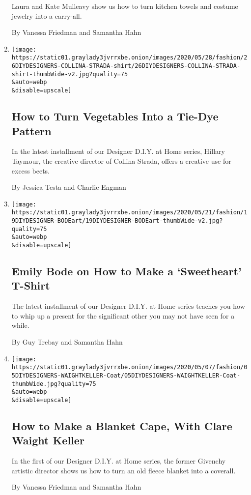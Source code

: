 \begin{enumerate}
  Laura and Kate Mulleavy show us how to turn kitchen towels and costume
  jewelry into a carry-all.

  By Vanessa Friedman and Samantha Hahn
\item
  \href{/2020/05/27/style/tie-dye-plaid-with-collina-strada.html}{}

  \texttt{[image: https://static01.graylady3jvrrxbe.onion/images/2020/05/28/fashion/26DIYDESIGNERS-COLLINA-STRADA-shirt/26DIYDESIGNERS-COLLINA-STRADA-shirt-thumbWide-v2.jpg?quality=75\\\&auto=webp\\\&disable=upscale]}

  \hypertarget{how-to-turn-vegetables-into-a-tie-dye-pattern}{%
  \subsection{How to Turn Vegetables Into a Tie-Dye
  Pattern}\label{how-to-turn-vegetables-into-a-tie-dye-pattern}}

  In the latest installment of our Designer D.I.Y. at Home series,
  Hillary Taymour, the creative director of Collina Strada, offers a
  creative use for excess beets.

  By Jessica Testa and Charlie Engman
\item
  \href{/2020/05/19/style/emily-bode-sweetheart-t-shirt.html}{}

  \texttt{[image: https://static01.graylady3jvrrxbe.onion/images/2020/05/21/fashion/19DIYDESIGNER-BODEart/19DIYDESIGNER-BODEart-thumbWide-v2.jpg?quality=75\\\&auto=webp\\\&disable=upscale]}

  \hypertarget{emily-bode-on-how-to-make-a-sweetheart-t-shirt}{%
  \subsection{Emily Bode on How to Make a `Sweetheart'
  T-Shirt}\label{emily-bode-on-how-to-make-a-sweetheart-t-shirt}}

  The latest installment of our Designer D.I.Y. at Home series teaches
  you how to whip up a present for the significant other you may not
  have seen for a while.

  By Guy Trebay and Samantha Hahn
\item
  \href{/2020/05/05/style/how-to-make-a-blanket-cape-with-clare-waight-keller.html}{}

  \texttt{[image: https://static01.graylady3jvrrxbe.onion/images/2020/05/07/fashion/05DIYDESIGNERS-WAIGHTKELLER-Coat/05DIYDESIGNERS-WAIGHTKELLER-Coat-thumbWide.jpg?quality=75\\\&auto=webp\\\&disable=upscale]}

  \hypertarget{how-to-make-a-blanket-cape-with-clare-waight-keller}{%
  \subsection{How to Make a Blanket Cape, With Clare Waight
  Keller}\label{how-to-make-a-blanket-cape-with-clare-waight-keller}}

  In the first of our Designer D.I.Y. at Home series, the former
  Givenchy artistic director shows us how to turn an old fleece blanket
  into a coverall.

  By Vanessa Friedman and Samantha Hahn
\end{enumerate}

